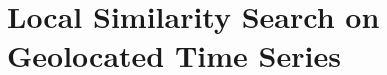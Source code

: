 \section{Local Similarity Search on Geolocated Time Series}\label{chap:3_3}

\graphicspath{{SIGSpatial2019/}}






